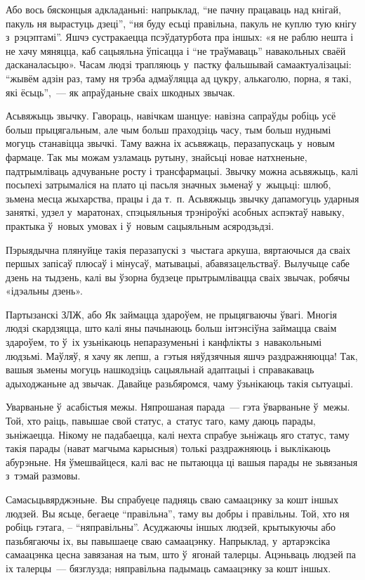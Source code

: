 Або вось бясконцыя адкладаньні: напрыклад, ``не пачну працаваць над кнігай, пакуль ня вырастуць дзеці'', ``ня буду есьці правільна, пакуль не куплю тую кнігу з~рэцэптамі''. Яшчэ сустракаецца псэўдатурбота пра іншых: «я не раблю нешта і не хачу мяняцца, каб сацыяльна ўпісацца і ``не траўмаваць'' навакольных сваёй дасканаласьцю». Часам людзі трапляюць у~пастку фальшывай самаактуалізацыі: ``жывём адзін раз, таму ня трэба адмаўляцца ад цукру, алькаголю, порна, я такі, які ёсьць'',~--- як апраўданьне сваіх шкодных звычак.

Асьвяжыць звычку. Гавораць, навічкам шанцуе: навізна сапраўды робіць усё больш прыцягальным, але чым больш праходзіць часу, тым больш нуднымі могуць станавіцца звычкі. Таму важна іх асьвяжаць, перазапускаць у~новым фармаце. Так мы можам узламаць рутыну, знайсьці новае натхненьне, падтрымліваць адчуваньне росту і трансфармацыі. Звычку можна асьвяжыць, калі посьпехі затрымаліся на плато ці пасьля значных зьменаў у~жыцьці: шлюб, зьмена месца жыхарства, працы і да т.~п. Асьвяжыць звычку дапамогуць ударныя заняткі, удзел у~маратонах, спэцыяльныя трэніроўкі асобных аспэктаў навыку, практыка ў~новых умовах і ў~новым сацыяльным асяродзьдзі.

Пэрыядычна плянуйце такія перазапускі з~чыстага аркуша, вяртаючыся да сваіх першых запісаў плюсаў і мінусаў, матывацыі, абавязацельстваў. Вылучыце сабе дзень на тыдзень, калі вы ўзорна будзеце прытрымлівацца сваіх звычак, робячы «ідэальны дзень».

Партызанскі ЗЛЖ, або Як займацца здароўем, не прыцягваючы ўвагі. Многія людзі скардзяцца, што калі яны пачынаюць больш інтэнсіўна займацца сваім здароўем, то ў~іх узьнікаюць непаразуменьні і канфлікты з~навакольнымі людзьмі. Маўляў, я хачу як лепш, а~гэтыя няўдзячныя яшчэ раздражняюцца! Так, вашыя зьмены могуць нашкодзіць сацыяльнай адаптацыі і справакаваць адыходжаньне ад звычак. Давайце разьбяромся, чаму ўзьнікаюць такія сытуацыі.

Уварваньне ў~асабістыя межы. Няпрошаная парада~--- гэта ўварваньне ў~межы. Той, хто раіць, павышае свой статус, а~статус таго, каму даюць парады, зьніжаецца. Нікому не падабаецца, калі нехта спрабуе зьніжаць яго статус, таму такія парады (нават магчыма карысныя) толькі раздражняюць і выклікаюць абурэньне. Ня ўмешвайцеся, калі вас не пытаюцца ці вашыя парады не зьвязаныя з~тэмай размовы.

Самасьцьвярджэньне. Вы спрабуеце падняць сваю самаацэнку за кошт іншых людзей. Вы ясьце, бегаеце ``правільна'', таму вы добры і правільны. Той, хто ня робіць гэтага, -- ``няправільны''. Асуджаючы іншых людзей, крытыкуючы або пазьбягаючы іх, вы павышаеце сваю самаацэнку. Напрыклад, у~артарэксіка самаацэнка цесна завязаная на тым, што ў~ягонай талерцы. Ацэньваць людзей па іх талерцы~--- бязглузда; няправільна падымаць самаацэнку за кошт іншых.

